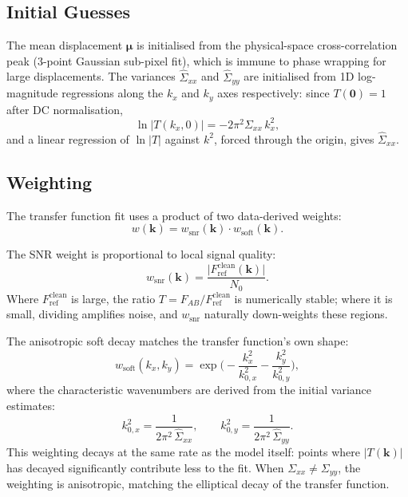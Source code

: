\documentclass[11pt,a4paper]{article}
\newcommand{\kv}{\mathbf{k}}
\newcommand{\muv}{\bm{\mu}}
\newcommand{\Fclean}{F_\mathrm{ref}^\mathrm{clean}}
\begin{document}
\subsection{Initial Guesses}

The mean displacement $\muv$ is initialised from the physical-space cross-correlation peak (3-point Gaussian sub-pixel fit), which is immune to phase wrapping for large displacements.
The variances $\hat\Sigma_{xx}$ and $\hat\Sigma_{yy}$ are initialised from 1D log-magnitude regressions along the $k_x$ and $k_y$ axes respectively: since $T(\mathbf{0}) = 1$ after DC normalisation,
%
\begin{equation}
    \ln\lvert T(k_x, 0)\rvert = -2\pi^2 \Sigma_{xx}\, k_x^2,
    \label{eq:1d_regression}
\end{equation}
%
and a linear regression of $\ln\lvert T\rvert$ against $k^2$, forced through the origin, gives $\hat\Sigma_{xx}$.

\subsection{Weighting}

The transfer function fit uses a product of two data-derived weights:
%
\begin{equation}
    w(\kv) = w_\mathrm{snr}(\kv) \cdot w_\mathrm{soft}(\kv).
    \label{eq:stage2_weight}
\end{equation}

The SNR weight is proportional to local signal quality:
%
\begin{equation}
    w_\mathrm{snr}(\kv) = \frac{\lvert\Fclean(\kv)\rvert}{N_0}.
    \label{eq:w_snr}
\end{equation}
%
Where $\Fclean$ is large, the ratio $T = F_{AB}/\Fclean$ is numerically stable; where it is small, dividing amplifies noise, and $w_\mathrm{snr}$ naturally down-weights these regions.

The anisotropic soft decay matches the transfer function's own shape:
%
\begin{equation}
    w_\mathrm{soft}(k_x, k_y) = \exp\!\biggl(-\frac{k_x^2}{k_{0,x}^2} - \frac{k_y^2}{k_{0,y}^2}\biggr),
    \label{eq:w_soft}
\end{equation}
%
where the characteristic wavenumbers are derived from the initial variance estimates:
%
\begin{equation}
    k_{0,x}^2 = \frac{1}{2\pi^2\, \hat\Sigma_{xx}}, \qquad
    k_{0,y}^2 = \frac{1}{2\pi^2\, \hat\Sigma_{yy}}.
    \label{eq:k0}
\end{equation}
%
This weighting decays at the same rate as the model itself: points where $\lvert T(\kv)\rvert$ has decayed significantly contribute less to the fit.
When $\Sigma_{xx} \neq \Sigma_{yy}$, the weighting is anisotropic, matching the elliptical decay of the transfer function.
\end{document}
